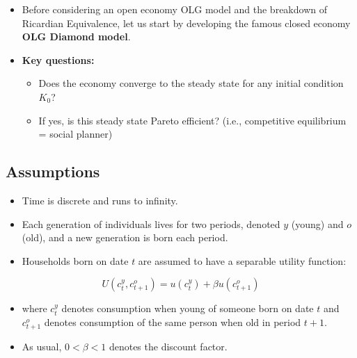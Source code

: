 \documentclass[12pt]{article}
\begin{document}
\begin{itemize}
    \item Before considering an open economy OLG model and the breakdown of Ricardian Equivalence, let us start by developing the famous closed economy \textbf{OLG Diamond model}.
    \item \textbf{Key questions:}
    \begin{itemize}
        \item Does the economy converge to the steady state for any initial condition $K_0$?
        \item If yes, is this steady state Pareto efficient? (i.e., competitive equilibrium = social planner)
    \end{itemize}
\end{itemize}

\vspace{0.5em}

\subsection*{\noindent\textbf{Assumptions}}

\begin{itemize}
    \item Time is discrete and runs to infinity.
    \item Each generation of individuals lives for two periods, denoted $y$ (young) and $o$ (old), and a new generation is born each period.
    \item Households born on date $t$ are assumed to have a separable utility function:
\end{itemize}

\[
U(c_t^y, c_{t+1}^o) = u(c_t^y) + \beta u(c_{t+1}^o)
\]

\begin{itemize}
    \item where $c_t^y$ denotes consumption when young of someone born on date $t$ and $c_{t+1}^o$ denotes consumption of the same person when old in period $t+1$.
    \item As usual, $0 < \beta < 1$ denotes the discount factor.
\end{itemize}
\end{document}
